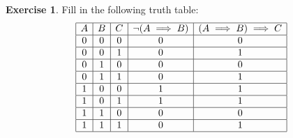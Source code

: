 \documentclass[a4paper,oneside]{article}
\theoremstyle{definition} \newtheorem{exercise}{Exercise}[section]
\begin{document}
\begin{exercise}
  Fill in the following truth table:
  \begin{align*}
    \begin{array}{|c|c|c|c|c|}
      \hline
      A & B & C & \neg(A\implies B) & (A\implies B) \implies C \\
      \hline
      0 & 0 & 0 & 0 & 0 \\
      \hline
      0 & 0 & 1 & 0 & 1 \\
      \hline
      0 & 1 & 0 & 0 & 0 \\
      \hline
      0 & 1 & 1 & 0 & 1 \\
      \hline
      1 & 0 & 0 & 1 & 1 \\
      \hline
      1 & 0 & 1 & 1 & 1 \\
      \hline
      1 & 1 & 0 & 0 & 0 \\
      \hline
      1 & 1 & 1 & 0 & 1 \\
      \hline
    \end{array}
  \end{align*}
\end{exercise}
\end{document}
